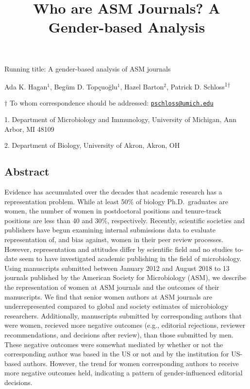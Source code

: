 \documentclass[11pt,]{article}
\title{\textbf{Who are ASM Journals? A Gender-based Analysis}}
\author{}
\date{}
\begin{document}
\maketitle

\vspace{35mm}

Running title: A gender-based analysis of ASM journals

\vspace{35mm}

Ada K. Hagan\({^1}\), Begüm D. Topçuoğlu\({^1}\), Hazel Barton\({^2}\),
Patrick D. Schloss\textsuperscript{1\(\dagger\)}

\vspace{40mm}

\(\dagger\) To whom correspondence should be addressed:
\href{mailto:pschloss@umich.edu}{\nolinkurl{pschloss@umich.edu}}

1. Department of Microbiology and Immunology, University of Michigan,
Ann Arbor, MI 48109

2. Department of Biology, University of Akron, Akron, OH

\newpage

\linenumbers

\subsection{Abstract}\label{abstract}

Evidence has accumulated over the decades that academic research has a
representation problem. While at least 50\% of biology Ph.D.~graduates
are women, the number of women in postdoctoral positions and
tenure-track positions are less than 40 and 30\%, respectively.
Recently, scientific societies and publishers have begun examining
internal submissions data to evaluate representation of, and bias
against, women in their peer review processes. However, representation
and attitudes differ by scientific field and no studies to-date seem to
have investigated academic publishing in the field of microbiology.
Using manuscripts submitted between January 2012 and August 2018 to 13
journals published by the American Society for Microbiology (ASM), we
describe the representation of women at ASM journals and the outcomes of
their manuscripts. We find that senior women authors at ASM journals are
underrepresented compared to global and society estimates of
microbiology researchers. Additionally, manuscripts submitted by
corresponding authors that were women, recieved more negative outcomes
(e.g., editorial rejections, reviewer recommendations, and decisions
after review), than those submitted by men. These negative outcomes were
somewhat mediated by whether or not the corresponding author was based
in the US or not and by the institution for US-based authors. However,
the trend for women corresponding authors to receive more negative
outcomes held, indicating a pattern of gender-influenced editorial
decisions.
\end{document}
